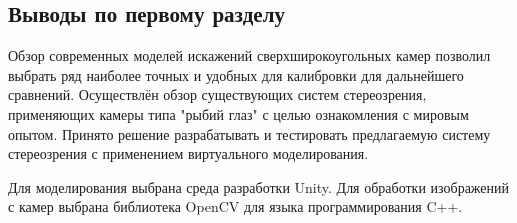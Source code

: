 \subsection{Выводы по первому разделу}

Обзор современных моделей искажений сверхширокоугольных камер позволил выбрать 
 ряд наиболее точных и удобных для калибровки для дальнейшего сравнений. Осуществлён
обзор существующих систем стереозрения, применяющих камеры типа "рыбий глаз" с 
целью ознакомления с мировым опытом. Принято решение разрабатывать и тестировать 
предлагаемую систему стереозрения с применением виртуального  моделирования. 

Для моделирования выбрана среда разработки Unity. Для обработки изображений
с камер выбрана библиотека OpenCV для языка программирования C++. 